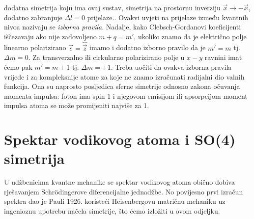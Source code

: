 \begin{primjer}
{    dodatna simetrija koju ima ovaj sustav, simetrija na prostornu
    inverziju $\vec{x} \to -\vec{x}$, dodatno zabranjuje $\Delta l =0$
prijelaze.}. Ovakvi uvjeti na prijelaze između kvantnih nivoa
nazivaju se \emph{izborna pravila}.  
Nadalje, kako Clebsch-Gordanovi koeficijenti iščezavaju ako
nije zadovoljeno $m+q = m'$, ukoliko znamo da je električno
polje linearno polarizirano 
$\vec{\epsilon} = \hat{\vec{z}}$ imamo i dodatno izborno
pravilo da je $m'=m$ tj. $\Delta m = 0$. Za transverzalno
ili cirkularno polarizirano polje u $x-y$ ravnini imat ćemo
pak $m'= m\pm 1$ tj. $\Delta m = \pm 1$.
Treba uočiti da ovakva izborna pravila vrijede i za kompleksnije
atome za koje ne znamo izračunati radijalni dio valnih funkcija.
Ona su naprosto posljedica sferne simetrije odnosno zakona očuvanja
momenta impulsa: foton ima spin 1 i njegovom emisijom ili apsorpcijom
moment impulsa atoma se može promijeniti najviše za 1.
\end{primjer}



\section{Spektar vodikovog atoma i SO(4) simetrija}
\label{sec:so4}
 

U udžbenicima kvantne mehanike se spektar vodikovog atoma obično
dobiva rješavanjem Schr\"{o}dingerove diferencijalne jednadžbe.
No povijesno prvi izračun spektra dao je Pauli 1926.
koristeći Heisenbergovu matričnu mehaniku uz
ingenioznu upotrebu načela simetrije, što ćemo izložiti u ovom odjeljku.


